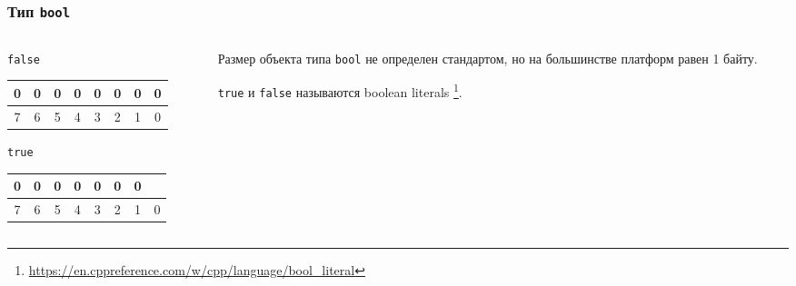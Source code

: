 \documentclass[compress, 8pt]{beamer}
\newenvironment{eightbit}{%
    \begin{center}
        \begin{tabular}{ |c|c|c|c|c|c|c|c|  }
            \hline
}{
        \hline
        \multicolumn{1}{c}{\color{gray}\tiny{7}} &
        \multicolumn{1}{c}{\color{gray}\tiny{6}} &
        \multicolumn{1}{c}{\color{gray}\tiny{5}} &
        \multicolumn{1}{c}{\color{gray}\tiny{4}} &
        \multicolumn{1}{c}{\color{gray}\tiny{3}} &
        \multicolumn{1}{c}{\color{gray}\tiny{2}} &
        \multicolumn{1}{c}{\color{gray}\tiny{1}} &
        \multicolumn{1}{c}{\color{gray}\tiny{0}} \\
        \end{tabular}
    \end{center}
}
\begin{document}
\begin{frame}[fragile]

    \frametitle{Тип \texttt{bool}}

    \begin{columns}[T]

        \begin{column}{0.5\textwidth}

            \verb|false|

            \begin{eightbit}
                0 & 0 & 0 & 0 & 0 & 0 & 0 & 0 \\
            \end{eightbit}

            \verb|true|

            \begin{eightbit}
                0 & 0 & 0 & 0 & 0 & 0 & 0 & \cellcolor{gray}{1} \\
            \end{eightbit}

        \end{column}

        \begin{column}{0.5\textwidth}

            Размер объекта типа \verb|bool| не определен стандартом,
            но на большинстве платформ равен 1 байту. \hfill \break

            \verb|true| и \verb|false| называются boolean literals
            \footnote{\tiny\url{https://en.cppreference.com/w/cpp/language/bool_literal}}.

        \end{column}

    \end{columns}

\end{frame}
\end{document}
